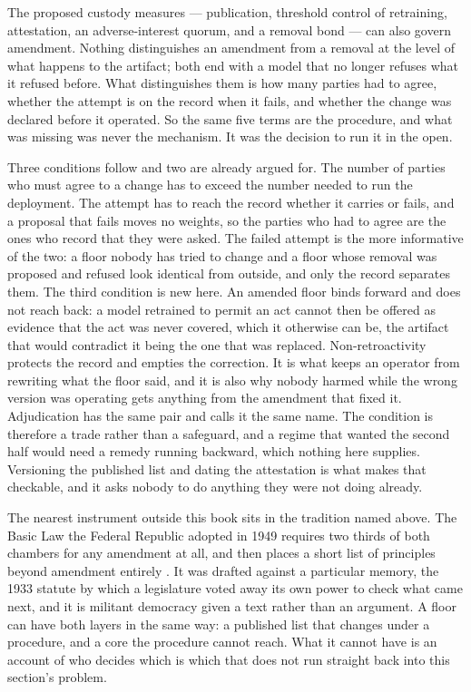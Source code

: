 The proposed custody measures — publication, threshold control of retraining, attestation, an adverse-interest quorum, and a removal bond — can also govern amendment. Nothing distinguishes an amendment from a removal at the level of what happens to the artifact; both end with a model that no longer refuses what it refused before. What distinguishes them is how many parties had to agree, whether the attempt is on the record when it fails, and whether the change was declared before it operated. So the same five terms are the procedure, and what was missing was never the mechanism. It was the decision to run it in the open.

Three conditions follow and two are already argued for. The number of parties who must agree to a change has to exceed the number needed to run the deployment. The attempt has to reach the record whether it carries or fails, and a proposal that fails moves no weights, so the parties who had to agree are the ones who record that they were asked. The failed attempt is the more informative of the two: a floor nobody has tried to change and a floor whose removal was proposed and refused look identical from outside, and only the record separates them. The third condition is new here. An amended floor binds forward and does not reach back: a model retrained to permit an act cannot then be offered as evidence that the act was never covered, which it otherwise can be, the artifact that would contradict it being the one that was replaced. Non-retroactivity protects the record and empties the correction. It is what keeps an operator from rewriting what the floor said, and it is also why nobody harmed while the wrong version was operating gets anything from the amendment that fixed it. Adjudication has the same pair and calls it the same name. The condition is therefore a trade rather than a safeguard, and a regime that wanted the second half would need a remedy running backward, which nothing here supplies. Versioning the published list and dating the attestation is what makes that checkable, and it asks nobody to do anything they were not doing already.

The nearest instrument outside this book sits in the tradition named above. The Basic Law the Federal Republic adopted in 1949 requires two thirds of both chambers for any amendment at all, and then places a short list of principles beyond amendment entirely \autocite{germany1949basiclaw}. It was drafted against a particular memory, the 1933 statute by which a legislature voted away its own power to check what came next, and it is militant democracy given a text rather than an argument. A floor can have both layers in the same way: a published list that changes under a procedure, and a core the procedure cannot reach. What it cannot have is an account of who decides which is which that does not run straight back into this section's problem.

